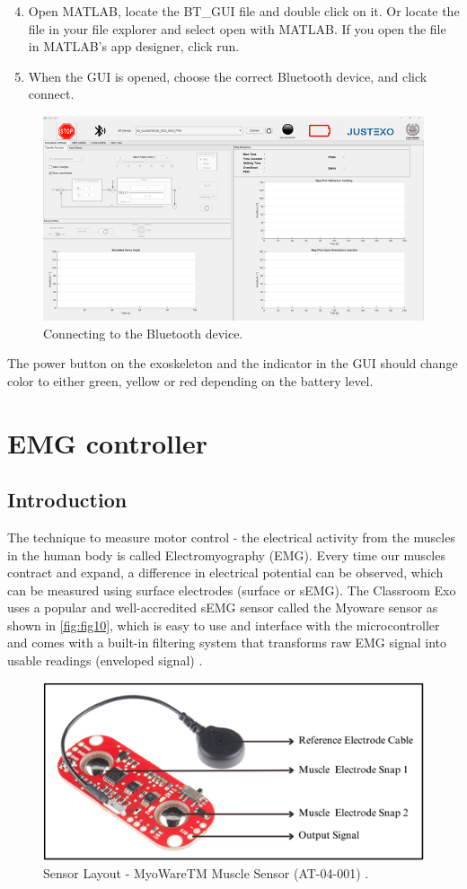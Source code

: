 \begin{enumerate}[]
	\setcounter{enumi}{3}
	\item Open MATLAB, locate the BT\_GUI file and double click on it. Or locate the file in your file explorer and select open with MATLAB. If you open the file in MATLAB’s app designer, click run.
	\item When the GUI is opened, choose the correct Bluetooth device, and click connect. 
\end{enumerate}

\begin{figure}[H]
	\centering
	\includegraphics[width=0.7\linewidth]{img/fig_10}
	\caption{Connecting to the Bluetooth device.}
	\label{fig:fig10}
\end{figure}

The power button on the exoskeleton and the indicator in the GUI should change color to either green, yellow or red depending on the battery level.


\newpage
\section{EMG controller}
\subsection{Introduction}
The technique to measure motor control - the electrical activity from the muscles in the human body is called Electromyography (EMG). Every time our muscles contract and expand, a difference in electrical potential can be observed, which can be measured using surface electrodes (surface or sEMG). The Classroom Exo uses a popular and well-accredited sEMG sensor called the Myoware sensor as shown in \autoref{fig:fig10}, which is easy to use and interface with the microcontroller and comes with a built-in filtering system that transforms raw EMG signal into usable readings (enveloped signal) \cite{AlTashi2024}.

\begin{figure}
	\centering
	\includegraphics[width=0.7\linewidth]{img/fig_11}
	\caption{Sensor Layout - MyoWareTM Muscle Sensor (AT-04-001) \cite{Myoware}.}
	\label{fig:fig11}
\end{figure}
 

